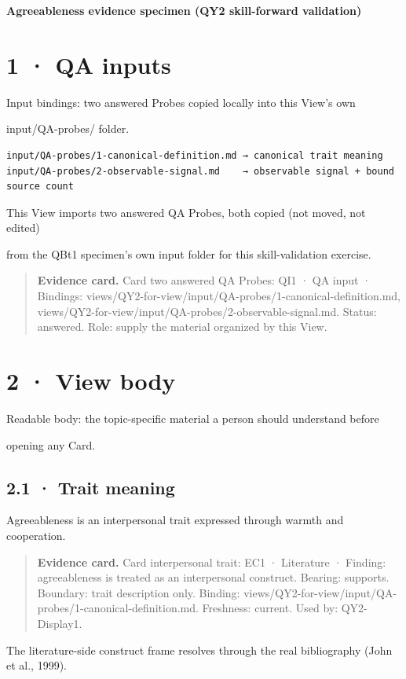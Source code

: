 \documentclass[11pt]{article}
\begin{document}
\begin{center}\LARGE\textbf{Agreeableness evidence specimen (QY2 skill-forward validation)}\end{center}
\section*{1 · QA inputs}
Input bindings: two answered Probes copied locally into this View's own

input/QA-probes/ folder.

\begin{Verbatim}[fontsize=\small]
input/QA-probes/1-canonical-definition.md → canonical trait meaning
input/QA-probes/2-observable-signal.md    → observable signal + bound source count
\end{Verbatim}
This View imports two answered QA Probes, both copied (not moved, not edited)

from the QBt1 specimen's own input folder for this skill-validation exercise.

\begin{quote}\footnotesize\textbf{Evidence card.} Card two answered QA Probes: QI1 · QA input · Bindings: views/QY2-for-view/input/QA-probes/1-canonical-definition.md, views/QY2-for-view/input/QA-probes/2-observable-signal.md. Status: answered. Role: supply the material organized by this View.\end{quote}
\section*{2 · View body}
Readable body: the topic-specific material a person should understand before

opening any Card.

\subsection*{2.1 · Trait meaning}
Agreeableness is an interpersonal trait expressed through warmth and cooperation.

\begin{quote}\footnotesize\textbf{Evidence card.} Card interpersonal trait: EC1 · Literature · Finding: agreeableness is treated as an interpersonal construct. Bearing: supports. Boundary: trait description only. Binding: views/QY2-for-view/input/QA-probes/1-canonical-definition.md. Freshness: current. Used by: QY2-Display1.\end{quote}
The literature-side construct frame resolves through the real bibliography (John et al., 1999).
\end{document}

